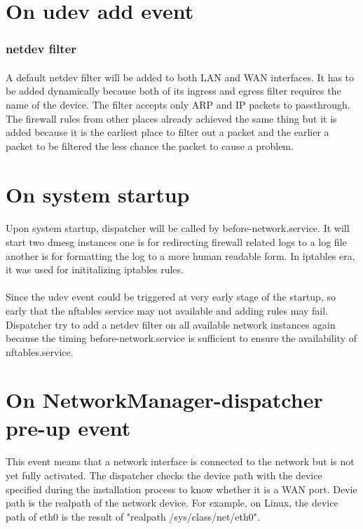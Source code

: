 \documentclass[mscthesis]{usiinfthesis}
\begin{document}
\section{On udev add event}
\subsubsection{netdev filter}
\paragraph{}
A default netdev filter will be added to both LAN and WAN interfaces. It has to be added dynamically because both of its ingress and egress filter requires the name of the device. The filter accepts only ARP and IP packets to passthrough. The firewall rules from other places already achieved the same thing but it is added because it is the earliest place to filter out a packet and the earlier a packet to be filtered the less chance the packet to cause a problem.

\section{On system startup}
\paragraph{}
Upon system startup, dispatcher will be called by before-network.service. It will start two dmesg instances one is for redirecting firewall related logs to a log file another is for formatting the log to a more human readable form. In iptables era, it was used for inititalizing iptables rules.
\paragraph{}
Since the udev event could be triggered at very early stage of the startup, so early that the nftables service may not available and adding rules may fail. Dispatcher try to add a netdev filter on all available network instances again because the timing before-network.service is sufficient to ensure the availability of nftables.service.

\section{On NetworkManager-dispatcher pre-up event}
\paragraph{}
This event means that a network interface is connected to the network but is not yet fully activated. The dispatcher checks the device path with the device specified during the installation process to know whether it is a WAN port. Devie path is the realpath of the network device. For example, on Linux, the device path of eth0 is the result of "realpath /sys/class/net/eth0".
\end{document}
